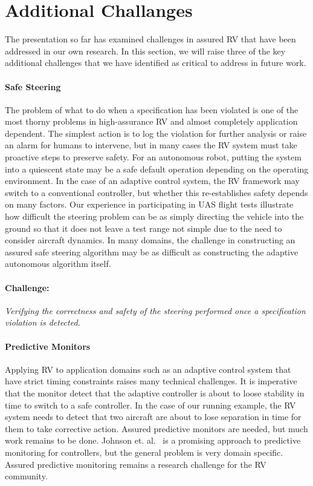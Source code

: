 \section{Additional Challanges }\label{sec:future} 
The presentation so far has examined challenges in assured RV that
have been addressed in our own research. In this section, we will
raise three of the key additional challenges that we have identified
as critical to address in future work.

\paragraph{Safe Steering} The problem of what to do when a
specification has been violated is one of the most thorny problems in
high-assurance RV and almost completely application dependent. The
simplest action is to log the violation for further analysis or raise
an alarm for humans to intervene, but in many cases the RV system must
take proactive steps to preserve safety. For an autonomous robot,
putting the system into a quiescent state may be a safe default
operation depending on the operating environment.  In the case of an
adaptive control system, the RV framework may switch to a conventional
controller, but whether this re-establishes safety depends on many
factors.  Our experience in participating in UAS flight tests
illustrate how difficult the steering problem can be as simply directing
the vehicle into the ground so that it does not leave a test range not simple due to the need to consider
aircraft dynamics.  In many domains, the challenge in constructing an
assured safe steering algorithm may be as difficult as constructing
the adaptive autonomous algorithm itself.

\paragraph{Challenge:}  \emph{Verifying the correctness and safety of the
steering performed once a specification violation is detected.}
 


\paragraph{Predictive Monitors} Applying RV to application domains
such as an adaptive control system that have strict timing constraints
raises many technical challenges.  It is imperative that the  monitor  detect that the
adaptive controller is about to loose stability in time to switch to a
safe controller. In the case of our running example, the RV system
needs to detect that two aircraft are about to lose separation in time
for them to take corrective action.  Assured predictive monitors are
needed, but much work remains to be done.  Johnson
et. al.~\cite{johnson2015tecs} is a promising approach to predictive
monitoring for controllers, but the general problem is very domain specific. Assured predictive
monitoring remains a research challenge for the RV community.

